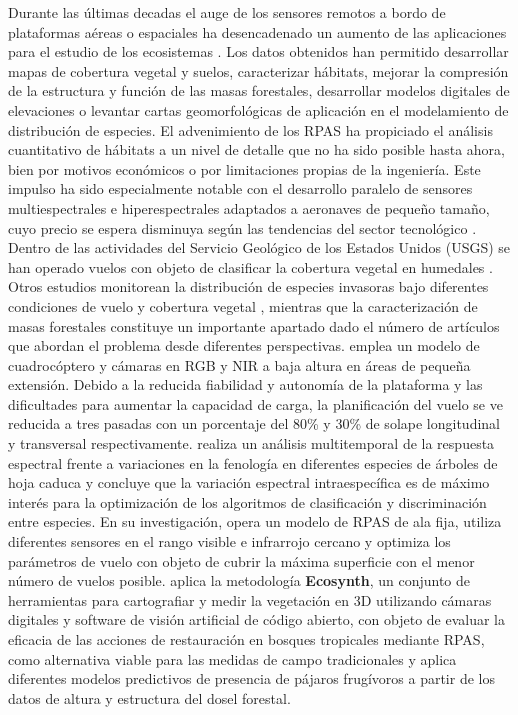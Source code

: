 \documentclass[9t,twocolumn]{article}
\begin{document}
Durante las últimas decadas el auge de los sensores remotos a bordo de
plataformas aéreas o espaciales ha desencadenado un aumento de las
aplicaciones para el estudio de los ecosistemas \citep{Wulder2004}. Los
datos obtenidos han permitido desarrollar mapas de cobertura vegetal y
suelos, caracterizar hábitats, mejorar la compresión de la estructura y
función de las masas forestales, desarrollar modelos digitales de
elevaciones o levantar cartas geomorfológicas de aplicación en el
modelamiento de distribución de especies. El advenimiento de los RPAS ha
propiciado el análisis cuantitativo de hábitats a un nivel de detalle
que no ha sido posible hasta ahora, bien por motivos económicos o por
limitaciones propias de la ingeniería. Este impulso ha sido
especialmente notable con el desarrollo paralelo de sensores
multiespectrales e hiperespectrales adaptados a aeronaves de pequeño
tamaño, cuyo precio se espera disminuya según las tendencias del sector
tecnológico . Dentro de las actividades del Servicio Geológico de los
Estados Unidos (USGS) se han operado vuelos con objeto de clasificar la
cobertura vegetal en humedales \citep{USGS2014}. Otros estudios
monitorean la distribución de especies invasoras bajo diferentes
condiciones de vuelo y cobertura vegetal \citep{Perroy2017}, mientras
que la caracterización de masas forestales constituye un importante
apartado dado el número de artículos que abordan el problema desde
diferentes perspectivas. \citep{Gini2012} emplea un modelo de
cuadrocóptero y cámaras en RGB y NIR a baja altura en áreas de pequeña
extensión. Debido a la reducida fiabilidad y autonomía de la plataforma
y las dificultades para aumentar la capacidad de carga, la planificación
del vuelo se ve reducida a tres pasadas con un porcentaje del 80\% y
30\% de solape longitudinal y transversal
respectivamente.\citep{Lisein2015} realiza un análisis multitemporal de
la respuesta espectral frente a variaciones en la fenología en
diferentes especies de árboles de hoja caduca y concluye que la
variación espectral intraespecífica es de máximo interés para la
optimización de los algoritmos de clasificación y discriminación entre
especies. En su investigación, opera un modelo de RPAS de ala fija,
utiliza diferentes sensores en el rango visible e infrarrojo cercano y
optimiza los parámetros de vuelo con objeto de cubrir la máxima
superficie con el menor número de vuelos posible. \citep{Zahawi2015}
aplica la metodología \textbf{Ecosynth}, un conjunto de herramientas
para cartografiar y medir la vegetación en 3D utilizando cámaras
digitales y software de visión artificial de código abierto, con objeto
de evaluar la eficacia de las acciones de restauración en bosques
tropicales mediante RPAS, como alternativa viable para las medidas de
campo tradicionales y aplica diferentes modelos predictivos de presencia
de pájaros frugívoros a partir de los datos de altura y estructura del
dosel forestal.
\end{document}
